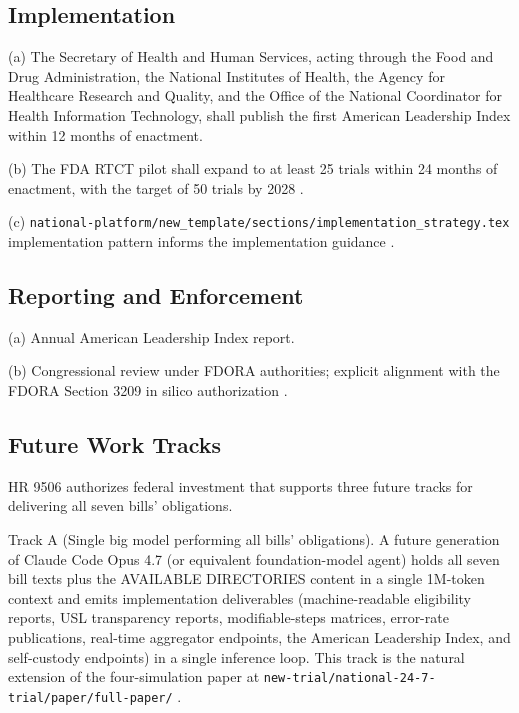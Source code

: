 \subsection{Implementation}

\hspace{0.5cm} (a) The Secretary of Health and Human Services, acting through the
Food and Drug Administration, the National Institutes of Health,
the Agency for Healthcare Research and Quality, and the Office of
the National Coordinator for Health Information Technology, shall
publish the first American Leadership Index within 12 months of
enactment.

(b) The FDA RTCT pilot shall expand to at least 25 trials within 24
months of enactment, with the target of 50 trials by 2028
\cite{fda_rtct_press_2026}.

(c) 
\texttt{national-platform/new\_template/sections/implementation\_strategy.tex} implementation pattern
informs the implementation guidance \cite{kawchak_2026_19244918}.

\subsection{Reporting and Enforcement}

\hspace{0.5cm} (a) Annual American Leadership Index report.

(b) Congressional review under FDORA authorities; explicit
alignment with the FDORA Section 3209 in silico authorization
\cite{rank4_fdora_fda_modernization_2022}.

\subsection{Future Work Tracks}

\hspace{0.5cm} HR 9506 authorizes federal investment that supports three future
tracks for delivering all seven bills' obligations.

Track A (Single big model performing all bills' obligations). A
future generation of Claude Code Opus 4.7 (or equivalent
foundation-model agent) holds all seven bill texts plus the
AVAILABLE DIRECTORIES content in a single 1M-token context and
emits implementation deliverables (machine-readable eligibility
reports, USL transparency reports, modifiable-steps matrices,
error-rate publications, real-time aggregator endpoints, the
American Leadership Index, and self-custody endpoints) in a single
inference loop. This track is the natural extension of the four-simulation paper at
\texttt{new-trial/national-24-7-trial/paper/full-paper/}
\cite{kawchak_2026_19994945, claude_opus_47}.

